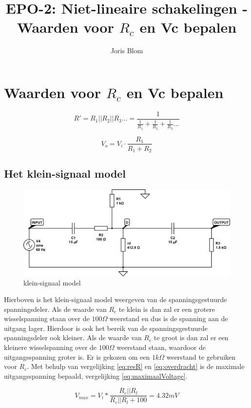 \documentclass{report}
\title{EPO-2: Niet-lineaire schakelingen - Waarden voor $R_c$ en Vc bepalen}
\author{Joris Blom}
\begin{document}
\chapter{Waarden voor $R_c$ en Vc bepalen}
\label{ch:Waarden voor $R_c$ en Vc bepalen}

\begin{equation}
\label{eq:resR}
R' = R_1||R_2||R_3... = \frac{1}{\frac{1}{R_1}+\frac{1}{R_2}+\frac{1}{R_3}...}
\end{equation}

\begin{equation}
\label{eq:overdracht}
V_o =V_i\cdot \frac{R_1}{R_1+R_2}
\end{equation}

\section{Het klein-signaal model}
\label{ch:Het klein-signaal model}
\begin{figure}[h]
\centering
\includegraphics[width=\textwidth]{kleinsignaalmodel.png}

\caption{klein-signaal model}
\end{figure}
Hierboven is het klein-signaal model weergeven van de spanningsgestuurde spanningsdeler. Als de waarde van $R_c$ te klein is dan zal er een grotere wisselspanning staan over de $100\Omega$ weerstand en dus is de spanning aan de uitgang lager. Hierdoor is ook het bereik van de spanningsgestuurde spanningsdeler ook kleiner. Als de waarde van $R_c$ te groot is dan zal er een kleinere wisselspanning over de $100\Omega$ weerstand staan, waardoor de uitgangsspanning groter is. Er is gekozen om een $1k\Omega$ weerstand te gebruiken voor $R_c$. Met behulp van vergelijking \ref{eq:resR} en \ref{eq:overdracht} is de maximale uitgangsspanning bepaald, vergelijking \ref{eq:maximaalVoltage}.

\begin{equation}
\label{eq:maximaalVoltage}
V_{max} = V_i * \frac{R_c||R_l}{R_c||R_l + 100} = 4.32 mV
\end{equation}
\end{document}
